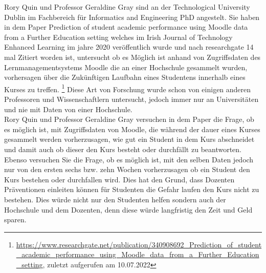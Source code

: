 Rory Quin und Professor Geraldine Gray sind an der \glqq Technological University Dublin\grqq{} im Fachbereich für \glqq Informatics and Engineering PhD \grqq{} angestelt.
Sie haben in dem Paper \glqq Prediction of student academic performance using Moodle data from a Further Education setting\grqq{} welches im Irish Journal of Technology Enhanced Learning im jahre 2020 veröffentlich wurde und nach researchgate 14 mal Zitiert worden ist, untersucht ob es Möglich ist anhand von Zugriffsdaten des Lernmanagementsystems Moodle die an einer Hochschule gesammelt wurden,
vorhersagen über die Zukünftigen Laufbahn eines Studentens innerhalb eines Kurses zu treffen. \footnote{\url{https://www.researchgate.net/publication/340908692_Prediction_of_student_academic_performance_using_Moodle_data_from_a_Further_Education_setting}, zuletzt aufgerufen am 10.07.2022} Diese Art von Forschung wurde schon von einigen anderen Professoren und Wissenschaftlern untersucht, jedoch immer nur an Universitäten und nie mit Daten von einer Hochschule. \cite[S. 5]{Quinn.2020}
\\ \noindent
Rory Quin und Professor Geraldine Gray versuchen in dem Paper die Frage, ob es möglich ist, mit Zugriffsdaten von Moodle, die während der dauer eines Kurses gesammelt werden vorherzusagen, wie gut ein Student in dem Kurs abschneidet und damit auch ob dieser den Kurs besteht oder durchfällt zu beantworten. 
Ebenso versuchen Sie die Frage, ob es möglich ist, mit den selben Daten jedoch nur von den ersten sechs bzw. zehn Wochen vorherzusagen ob ein Student den Kurs bestehen oder durchfallen wird. \cite[S. 5]{Quinn.2020}
Dies hat den Grund, dass Dozenten Präventionen einleiten können für Studenten die Gefahr laufen den Kurs nicht zu bestehen. Dies würde nicht nur den Studenten helfen sondern auch der Hochschule und dem Dozenten, denn diese würde langfristig den Zeit und Geld sparen. \cite[S. 15]{Quinn.2020}

